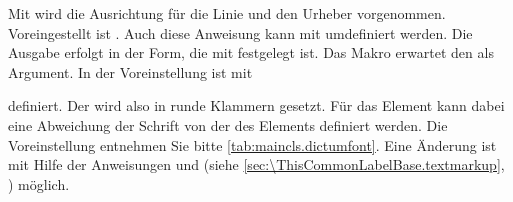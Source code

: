 Mit  wird die
Ausrichtung für die Linie und den Urheber vorgenommen.  Voreingestellt ist
. Auch diese Anweisung kann mit 
umdefiniert werden. Die Ausgabe erfolgt in der Form, die mit
 festgelegt
ist. Das Makro erwartet den  als Argument. In der
Voreinstellung ist  mit
\begin{lstcode}
  \newcommand*{\dictumauthorformat}[1]{(#1)}
\end{lstcode}
definiert. Der  wird also in runde Klammern gesetzt. %
\BeginIndexGroup
{}%
Für das Element
 kann dabei
eine Abweichung der Schrift von der des Elements %
%
 definiert werden. Die Voreinstellung
entnehmen Sie bitte
\autoref{tab:maincls.dictumfont}. Eine Änderung ist mit Hilfe der
Anweisungen  und
 (siehe
\autoref{sec:\ThisCommonLabelBase.textmarkup},
) möglich.%
\EndIndexGroup

